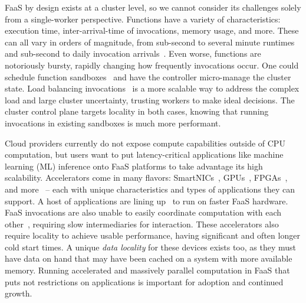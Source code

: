 FaaS by design exists at a cluster level, so we cannot consider its challenges solely from a single-worker perspective.
Functions have a variety of characteristics: execution time, inter-arrival-time of invocations, memory usage, and more.
These can all vary in orders of magnitude, from sub-second to several minute runtimes and sub-second to daily invocation arrivals~\cite{shahrad2020serverless}.
Even worse, functions are notoriously bursty, rapidly changing how frequently invocations occur.
One could schedule function sandboxes~\cite{balaji2021fireplace,kaffes2021practical,abdi2023palette,openwhisk} and have the controller micro-manage the cluster state.
Load balancing invocations~\cite{aumala2019beyond,leegreedy,faaslb-hpdc22} is a more scalable way to address the complex load and large cluster uncertainty, trusting workers to make ideal decisions.
The cluster control plane targets locality in both cases, knowing that running invocations in existing sandboxes is much more performant.

Cloud providers currently do not expose compute capabilities outside of CPU computation, but users want to put latency-critical applications like machine learning (ML) inference onto FaaS platforms to take advantage its high scalability.
Accelerators come in many flavors: SmartNICs~\cite{choi2020lambda}, GPUs~\cite{pemberton2022kernel,guleria2019emf}, FPGAs~\cite{bacis2020blastfunction}, and more~\cite{du2022serverless,romero2021llama} -- each with unique characteristics and types of applications they can support.
A host of applications are lining up~\cite{yang2022infless,ali2022optimizing,zhang2019video,risco2021gpu,hung2019rapid,shankar2020serverless} to run on faster FaaS hardware.
FaaS invocations are also unable to easily coordinate computation with each other~\cite{yuan2022smpi,copik2023fmi,copik2022faaskeeper,sreekanti2020fault,sreekanti2020cloudburst,giantsidi2023flexlog,xu2021lambdadnn}, requiring slow intermediaries for interaction.
These accelerators also require locality to achieve usable performance, having significant and often longer cold start times.
A unique \emph{data locality} for these devices exists too, as they must have data on hand that may have been cached on a system with more available memory.
Running accelerated and massively parallel computation in FaaS that puts not restrictions on applications is important for adoption and continued growth.

